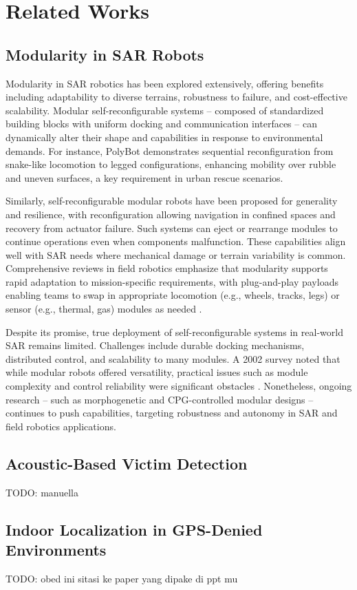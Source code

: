 \section{Related Works}

\subsection{Modularity in SAR Robots}
Modularity in SAR robotics has been explored extensively, offering benefits including adaptability to diverse terrains, robustness to failure, and cost-effective scalability. Modular self-reconfigurable systems -- composed of standardized building blocks with uniform docking and communication interfaces -- can dynamically alter their shape and capabilities in response to environmental demands. For instance, PolyBot \cite{PolyBot} demonstrates sequential reconfiguration from snake-like locomotion to legged configurations, enhancing mobility over rubble and uneven surfaces, a key requirement in urban rescue scenarios.

Similarly, self-reconfigurable modular robots have been proposed for generality and resilience, with reconfiguration allowing navigation in confined spaces and recovery from actuator failure. Such systems can eject or rearrange modules to continue operations even when components malfunction. These capabilities align well with SAR needs where mechanical damage or terrain variability is common. Comprehensive reviews in field robotics emphasize that modularity supports rapid adaptation to mission-specific requirements, with plug-and-play payloads enabling teams to swap in appropriate locomotion (e.g., wheels, tracks, legs) or sensor (e.g., thermal, gas) modules as needed \cite{ModularRobotic}.

Despite its promise, true deployment of self-reconfigurable systems in real-world SAR remains limited. Challenges include durable docking mechanisms, distributed control, and scalability to many modules. A 2002 survey \cite{wiredBots2002} noted that while modular robots offered versatility, practical issues such as module complexity and control reliability were significant obstacles \cite{}. Nonetheless, ongoing research -- such as morphogenetic and CPG-controlled modular designs \cite{CPGLocomotion} -- continues to push capabilities, targeting robustness and autonomy in SAR and field robotics applications.

\subsection{Acoustic-Based Victim Detection}
TODO: manuella

\subsection{Indoor Localization in GPS-Denied Environments}
TODO: obed \cite{WSNCentroid} ini sitasi ke paper yang dipake di ppt mu
